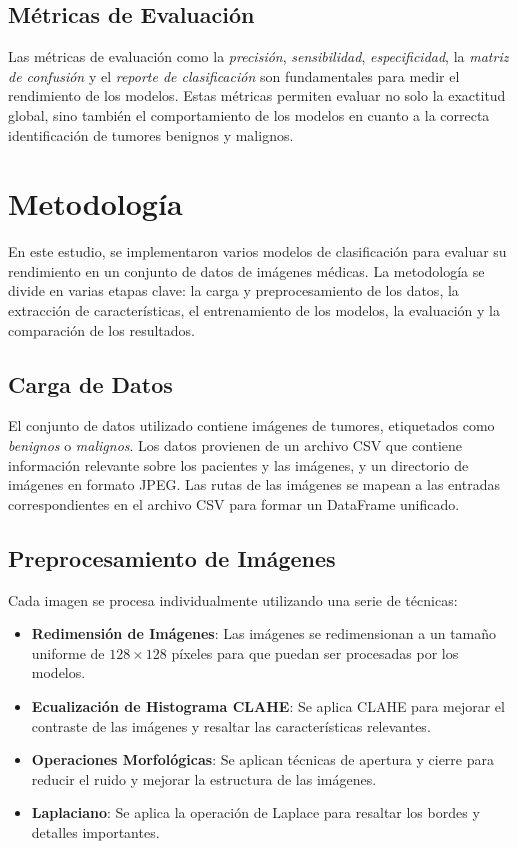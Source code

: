 \documentclass[12pt]{article}
\begin{document}
\subsection{Métricas de Evaluación}
Las métricas de evaluación como la \textit{precisión}, \textit{sensibilidad}, \textit{especificidad}, la \textit{matriz de confusión} y el \textit{reporte de clasificación} son fundamentales para medir el rendimiento de los modelos. Estas métricas permiten evaluar no solo la exactitud global, sino también el comportamiento de los modelos en cuanto a la correcta identificación de tumores benignos y malignos.

\section{Metodología}
En este estudio, se implementaron varios modelos de clasificación para evaluar su rendimiento en un conjunto de datos de imágenes médicas. La metodología se divide en varias etapas clave: la carga y preprocesamiento de los datos, la extracción de características, el entrenamiento de los modelos, la evaluación y la comparación de los resultados.

\subsection{Carga de Datos}
El conjunto de datos utilizado contiene imágenes de tumores, etiquetados como \textit{benignos} o \textit{malignos}. Los datos provienen de un archivo CSV que contiene información relevante sobre los pacientes y las imágenes, y un directorio de imágenes en formato JPEG. Las rutas de las imágenes se mapean a las entradas correspondientes en el archivo CSV para formar un DataFrame unificado.

\subsection{Preprocesamiento de Imágenes}
Cada imagen se procesa individualmente utilizando una serie de técnicas:
\begin{itemize}
    \item \textbf{Redimensión de Imágenes}: Las imágenes se redimensionan a un tamaño uniforme de $128 \times 128$ píxeles para que puedan ser procesadas por los modelos.
    \item \textbf{Ecualización de Histograma CLAHE}\cite{pizer1987adaptive}: Se aplica CLAHE para mejorar el contraste de las imágenes y resaltar las características relevantes.
    \item \textbf{Operaciones Morfológicas\cite{soille1999morphological}}: Se aplican técnicas de apertura y cierre para reducir el ruido y mejorar la estructura de las imágenes.
    \item \textbf{Laplaciano}: Se aplica la operación de Laplace para resaltar los bordes y detalles importantes.
\end{itemize}
\end{document}
